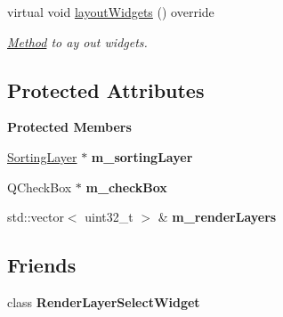 \begin{Indent}
\begin{DoxyCompactItemize}
\mbox{\label{classrev_1_1_view_1_1_render_layer_instance_widget_ab6437ff0f7a6c4f0efe2cf86e6ba8ba0}} 
virtual void \mbox{\hyperlink{classrev_1_1_view_1_1_render_layer_instance_widget_ab6437ff0f7a6c4f0efe2cf86e6ba8ba0}{layout\+Widgets}} () override
\begin{DoxyCompactList}\small\item\em \mbox{\hyperlink{struct_method}{Method}} to ay out widgets. \end{DoxyCompactList}\end{DoxyCompactItemize}
\end{Indent}
\subsection*{Protected Attributes}
\begin{Indent}\textbf{ Protected Members}\par
\begin{DoxyCompactItemize}
\item 
\mbox{\label{classrev_1_1_view_1_1_render_layer_instance_widget_a5c111738cc58e3649a27c8c44b585760}} 
\mbox{\hyperlink{structrev_1_1_sorting_layer}{Sorting\+Layer}} $\ast$ {\bfseries m\+\_\+sorting\+Layer}
\item 
\mbox{\label{classrev_1_1_view_1_1_render_layer_instance_widget_a38af2df6109e9f2e447a9e5231f4dc45}} 
Q\+Check\+Box $\ast$ {\bfseries m\+\_\+check\+Box}
\item 
\mbox{\label{classrev_1_1_view_1_1_render_layer_instance_widget_a960b4b995e7b03b0dadf29ae8d66ecb3}} 
std\+::vector$<$ uint32\+\_\+t $>$ \& {\bfseries m\+\_\+render\+Layers}
\end{DoxyCompactItemize}
\end{Indent}
\subsection*{Friends}
\begin{DoxyCompactItemize}
\item 
\mbox{\label{classrev_1_1_view_1_1_render_layer_instance_widget_ada85eef2ccf0f12fefe62f37eb125cd0}} 
class {\bfseries Render\+Layer\+Select\+Widget}
\end{DoxyCompactItemize}
